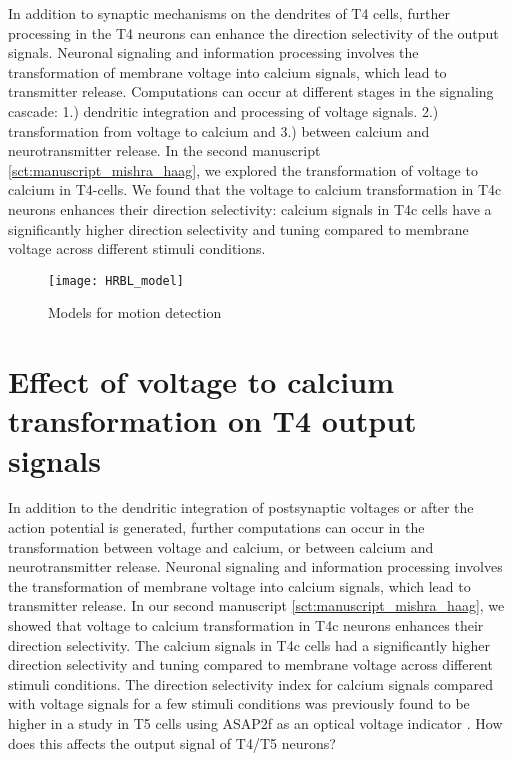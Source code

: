 In addition to synaptic mechanisms on the dendrites of T4 cells, further processing in the T4 neurons can enhance the direction selectivity of the output signals. Neuronal signaling and information processing involves the transformation of membrane voltage into calcium signals, which lead to transmitter release. Computations can occur at different stages in the signaling cascade: 1.) dendritic integration and processing of voltage signals. 2.) transformation from voltage to calcium and 3.) between calcium and neurotransmitter release. In the second manuscript \ref{sct:manuscript_mishra_haag}, we explored the transformation of voltage to calcium in T4-cells. We found that the voltage to calcium transformation in T4c neurons enhances their direction selectivity: calcium signals in T4c cells have a significantly higher direction selectivity and tuning compared to membrane voltage across different stimuli conditions. 
\begin{figure}
\centering
\hspace*{-2cm} 
\texttt{[image: HRBL\_model]}
\caption[Models for motion detection] {Models for motion detection}
\label{fig:hrblmodel}
\end{figure}
\section{Effect of voltage to calcium transformation on T4 output signals}
In addition to the dendritic integration of postsynaptic voltages or after the action potential is generated, further computations can occur in the transformation between voltage and calcium, or between calcium and neurotransmitter release. Neuronal signaling and information processing involves the transformation of membrane voltage into calcium signals, which lead to transmitter release. In our second manuscript \ref{sct:manuscript_mishra_haag}, we showed that voltage to calcium transformation in T4c neurons enhances their direction selectivity. The calcium signals in T4c cells had a significantly higher direction selectivity and tuning compared to membrane voltage across different stimuli conditions. The direction selectivity index for calcium signals compared with voltage signals for a few stimuli conditions was previously found to be higher in a study in T5 cells using ASAP2f as an optical voltage indicator \parencite{Wienecke2018}. How does this affects the output signal of T4/T5 neurons?

